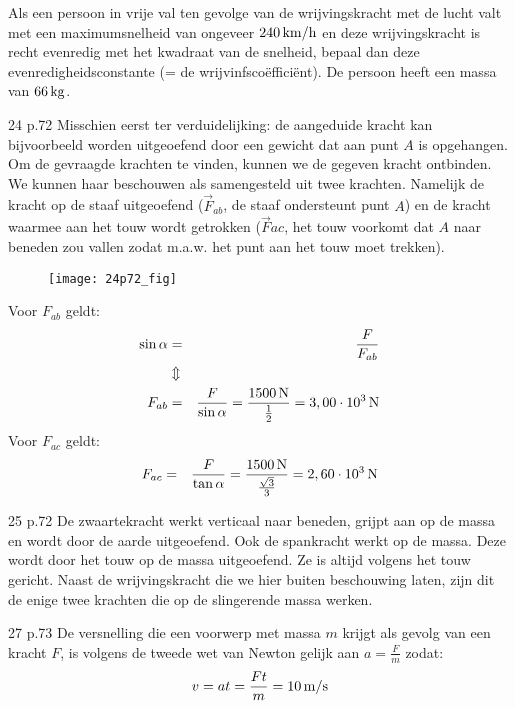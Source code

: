 \begin{exercise} Als een persoon in vrije val ten gevolge van de
wrijvingskracht met de lucht valt met een maximumsnelheid van
ongeveer $240\rm\,km/h$ en deze wrijvingskracht is recht evenredig
met het kwadraat van de snelheid, bepaal dan deze
evenredigheidsconstante (= de wrijvinfsco\"effici\"ent). De persoon
heeft een massa van $66\rm\,kg$.


\begin{oplossing}
\item[24 p.72]Misschien eerst ter verduidelijking: de aangeduide kracht kan bijvoorbeeld worden uitgeoefend door een gewicht dat aan punt $A$ is opgehangen. Om de gevraagde krachten te vinden, kunnen we de gegeven kracht ontbinden. We kunnen haar beschouwen als samengesteld uit twee krachten. Namelijk de kracht op de staaf uitgeoefend ($\vec{F}_{ab}$, de staaf ondersteunt punt $A$) en de kracht waarmee aan het touw wordt getrokken ($\vec{F}{ac}$, het touw voorkomt dat $A$ naar beneden zou vallen zodat m.a.w. het punt aan het touw moet trekken).
    \begin{figure}[h]
    \centering\texttt{[image: 24p72\_fig]}
    \end{figure}
    \newline
    Voor $F_{ab}$ geldt:
    \begin{eqnarray*}
    \sin{\alpha}&=&\frac{F}{F_{ab}}\\
    &\Updownarrow&\\
    F_{ab}&=&\frac{F}{\sin{\alpha}}=\frac{1500\rm\,N}{\frac{1}{2}}=3,00\cdot10^3\rm\,N
    \end{eqnarray*}
    Voor $F_{ac}$ geldt:
    \begin{eqnarray*}
    F_{ac}&=&\frac{F}{\tan{\alpha}}=\frac{1500\rm\,N}{\frac{\sqrt{3}}{3}}=2,60\cdot10^3\rm\,N
    \end{eqnarray*}

\item[25 p.72]De zwaartekracht werkt verticaal naar beneden, grijpt aan op de massa en wordt door de aarde uitgeoefend. Ook de spankracht werkt op de massa. Deze wordt door het touw op de massa uitgeoefend. Ze is altijd volgens het touw gericht. Naast de wrijvingskracht die we hier buiten beschouwing laten, zijn dit de enige twee krachten die op de slingerende massa werken.

\item[27 p.73]De versnelling die een voorwerp met massa $m$ krijgt als gevolg van een kracht $F$, is volgens de tweede wet van Newton gelijk aan $a=\frac{F}{m}$ zodat:
\begin{eqnarray*}
v=at=\frac{Ft}{m}=10\rm\,m/s
\end{eqnarray*}


\end{oplossing}
\end{exercise}
